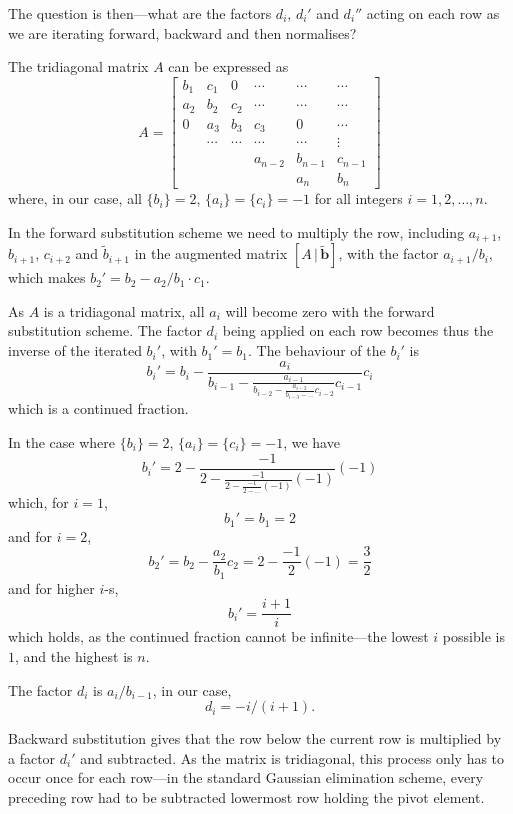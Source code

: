 \documentclass[a4paper,11pt]{article}
\begin{document}
    The question is then---what are the factors $d_i$, $d_i'$ and $d_i''$ acting on each row as we are iterating forward, backward and then normalises? 

    The tridiagonal matrix $A$ can be expressed as
    \[
        A = \begin{bmatrix}
            b_1     & c_1 & 0       & \cdots & \cdots & \cdots \\
            a_2     & b_2 & c_2     & \cdots & \cdots & \cdots \\
            0       & a_3 & b_3     & c_3    & 0      & \cdots \\
                   &\cdots& \cdots  & \cdots & \cdots & \vdots \\
                    &     &         & a_{n-2}& b_{n-1}& c_{n-1}\\
                    &     &         &        & a_n    & b_n
            \end{bmatrix}
    \]
    where, in our case, all $\{b_i\} = 2$, $\{a_i\} = \{c_i\} = -1$ for all integers $i=1,2,\dots,n$. 
    
    In the forward substitution scheme we need to multiply the row, including $a_{i+1}$, $b_{i+1}$, $c_{i+2}$ and $\tilde{b}_{i+1}$ in the augmented matrix $[A \, | \, \tilde{\mathbf{b}} ]$, with the factor $a_{i+1}/b_i$, which makes $b_2' = b_2 - a_2/b_1 \cdot c_1$.

    As $A$ is a tridiagonal matrix, all $a_i$ will become zero with the forward substitution scheme. The factor $d_i$ being applied on each row becomes thus the inverse of the iterated $b_i'$, with $b_1' = b_1$. The behaviour of the $b_i'$ is
    \[ b_i' = b_i - \frac{a_i}{b_{i-1} - \frac{a_{i-1}}{b_{i-2} - \frac{a_{i-2}}{b_{i-3} - \dots} c_{i-2}  } c_{i-1} } c_i \]
    which is a continued fraction.

    In the case where $\{b_i\} = 2$, $\{a_i\} = \{c_i\} = -1$, we have
    \[ b_i' = 2 - \frac{-1}{2 - \frac{-1}{2 - \frac{-1}{2 - \dots}(-1)}(-1)}(-1) \]
    which, for $i=1$,
    \[ b_1' = b_1 = 2 \]
    and for $i=2$,
    \[ b_2' = b_2 - \frac{a_2}{b_1} c_2 = 2 - \frac{-1}{2}(-1) = \frac{3}{2} \]
    and for higher $i$-s, 
    \[ b_i' = \frac{i+1}{i} \]
    which holds, as the continued fraction cannot be infinite---the lowest $i$ possible is $1$, and the highest is $n$.

    The factor $d_i$ is $a_i/b_{i-1}$, in our case,
    \[ d_i = -i/(i+1). \]

    Backward substitution gives that the row below the current row is multiplied by a factor $d_i'$ and subtracted. As the matrix is tridiagonal, this process only has to occur once for each row---in the standard Gaussian elimination scheme, every preceding row had to be subtracted lowermost row holding the pivot element. 
\end{document}
